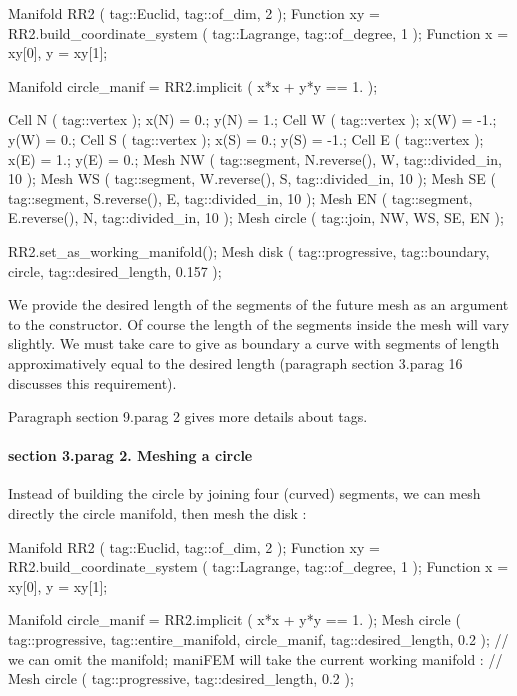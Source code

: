 \verbatim
   Manifold RR2 ( tag::Euclid, tag::of_dim, 2 );
   Function xy = RR2.build_coordinate_system ( tag::Lagrange, tag::of_degree, 1 );
   Function x = xy[0],  y = xy[1];
   
   Manifold circle_manif = RR2.implicit ( x*x + y*y == 1. );
   
   Cell N ( tag::vertex );  x(N) =  0.;   y(N) =  1.;
   Cell W ( tag::vertex );  x(W) = -1.;   y(W) =  0.;
   Cell S ( tag::vertex );  x(S) =  0.;   y(S) = -1.;
   Cell E ( tag::vertex );  x(E) =  1.;   y(E) =  0.;
   Mesh NW ( tag::segment, N.reverse(), W, tag::divided_in, 10 );
   Mesh WS ( tag::segment, W.reverse(), S, tag::divided_in, 10 );
   Mesh SE ( tag::segment, S.reverse(), E, tag::divided_in, 10 );
   Mesh EN ( tag::segment, E.reverse(), N, tag::divided_in, 10 );
   Mesh circle ( tag::join, NW, WS, SE, EN );
   
   RR2.set_as_working_manifold();
   Mesh disk ( tag::progressive, tag::boundary, circle, tag::desired_length, 0.157 );
\endverbatim

We provide the desired length of the segments of the future mesh as an argument to the
constructor.
Of course the length of the segments inside the mesh will vary slightly.
We must take care to give as boundary a curve with segments of length approximatively equal
to the desired length (paragraph \numb section 3.\numb parag 16 discusses this requirement).

Paragraph \numb section 9.\numb parag 2 gives more details about {\codett tag}s.


\paragraph{\numb section 3.\numb parag 2. Meshing a circle}

Instead of building the circle by joining four (curved) segments, we can mesh directly
the circle manifold, then mesh the disk :

\verbatim
   Manifold RR2 ( tag::Euclid, tag::of_dim, 2 );
   Function xy = RR2.build_coordinate_system ( tag::Lagrange, tag::of_degree, 1 );
   Function x = xy[0],  y = xy[1];
   
   Manifold circle_manif = RR2.implicit ( x*x + y*y == 1. );
   Mesh circle ( tag::progressive,
      tag::entire_manifold, circle_manif, tag::desired_length, 0.2 );
   // we can omit the manifold; maniFEM will take the current working manifold :
   // Mesh circle ( tag::progressive, tag::desired_length, 0.2 );
   
